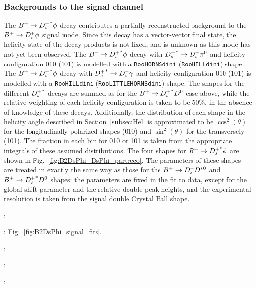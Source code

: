 \subsubsection{Backgrounds to the signal channel}
{\color{Blue}


\begin{description}
\item The ${B}^+ \rightarrow {\ensuremath{{D}^+_{s}}}^{*} \phi$ decay contributes a partially reconstructed background to the ${{B}^+} \rightarrow {\ensuremath{{D}^+_{s}}} \phi$ signal mode.
Since this decay has a vector-vector final state, the helicity state of the decay products is not fixed, and is unknown as this mode has not yet been observed.
The ${B}^+ \rightarrow {\ensuremath{{D}^+_{s}}}^{*} \phi$ decay with ${{D}^+_{s}}^{*} \rightarrow {\ensuremath{{D}^+_{s}}} \pi^0$ and helicity configuration 010 (101) is modelled with a \texttt{RooHORNSdini} (\texttt{RooHILLdini}) shape.
The ${B}^+ \rightarrow {\ensuremath{{D}^+_{s}}}^{*} \phi$ decay with ${{D}^+_{s}}^{*} \rightarrow {\ensuremath{{D}^+_{s}}} \gamma$ and helicity configuration 010 (101) is modelled with a \texttt{RooHILLdini} (\texttt{RooLITTLEHORNSdini}) shape.
The shapes for the different ${{D}^+_{s}}^{*}$ decays are summed as for the ${B}^+ \rightarrow {\ensuremath{{D}^+_{s}}}^{*} D^{0}$ case above, while the relative weighting of each helicity configuration is taken 
to be 50\%, in the absence of knowledge of these decays. Additionally, the distribution of each shape in the helicity angle described in Section~\ref{subsec:Hel} is approximated to be $\cos^2(\theta)$ for the longitudinally polarized shapes (010) and $\sin^2(\theta)$ for the transversely (101). The fraction in each bin for 010 or 101 is taken from the appropriate integrals of these assumed distributions. 
The four shapes for ${B}^+ \rightarrow {\ensuremath{{D}^+_{s}}}^{*} \phi$ are shown in Fig.~\ref{fig:B2DsPhi_DsPhi_partreco}.
The parameters of these shapes are treated in exactly the same way as those for the ${B}^+ \rightarrow {\ensuremath{{D}^+_{s}}} D^{*0}$ and ${B}^+ \rightarrow {\ensuremath{{D}^+_{s}}}^{*} D^{0}$ shapes: the parameters are fixed in the fit to data, except for the global shift parameter and the relative double peak heights, and the experimental resolution is taken from the signal double Crystal Ball shape.

\item \decay{\Bsb}{\Dsp\Km\Kstarz}: 
\item \decay{\Bsb}{\Dssp\Km\Kstarz}: Fig.~\ref{fig:B2DsPhi_signal_fits}.
\item \decay{\Bsb}{\Dsp\Dsm}: 
\item \decay{\Bzb}{\Dsp\Dm}: 
\item \decay{\Bsb}{\Dssp\Dsm}: 
\end{description}
}


